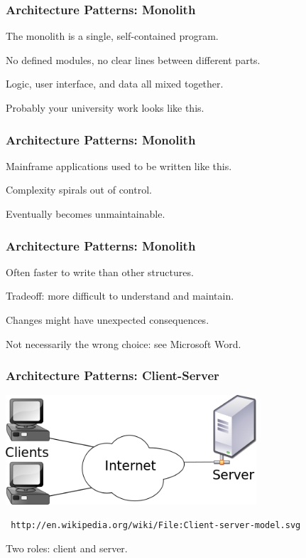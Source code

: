 \begin{frame}
\frametitle{Architecture Patterns: Monolith}

\begin{changemargin}{1cm}
The monolith is a single, self-contained program.

No defined modules, no clear lines between different parts.

Logic, user interface, and data all mixed together.

Probably your university work looks like this.

\end{changemargin}
\end{frame}


\begin{frame}
\frametitle{Architecture Patterns: Monolith}

\begin{changemargin}{1cm}
Mainframe applications used to be written like this.

Complexity spirals out of control.

Eventually becomes unmaintainable.


\end{changemargin}
\end{frame}

\begin{frame}
\frametitle{Architecture Patterns: Monolith}

\begin{changemargin}{1cm}

Often faster to write than other structures.

Tradeoff: more difficult to understand and maintain.

Changes might have unexpected consequences.

Not necessarily the wrong choice: see Microsoft Word.


\end{changemargin}
\end{frame}


\begin{frame}
\frametitle{Architecture Patterns: Client-Server}


\begin{center}
	\includegraphics[width=0.7\textwidth]{images/Client-server-model.png}
	
	\texttt{\small
 http://en.wikipedia.org/wiki/File:Client-server-model.svg}
\end{center}

Two roles: client and server.

\end{frame}

